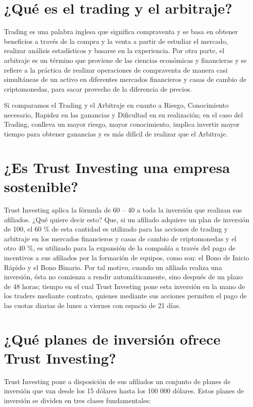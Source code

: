 \documentclass[12pt,letterpaper]{article}
\begin{document}
	\section{¿Qué es el trading y el arbitraje?}
	Trading es una palabra inglesa que significa compraventa y se basa en obtener beneficios a través de la compra y la venta a partir de estudiar el mercado, realizar análisis estadísticos y basarse en la experiencia. Por otra parte, el arbitraje es un término que proviene de las ciencias económicas y financieras y se refiere a la práctica de realizar operaciones de compraventa de manera casi simultáneas de un activo en diferentes mercados financieros y casas de cambio de criptomonedas, para sacar provecho de la diferencia de precios.
	
	Si comparamos el Trading y el Arbitraje en cuanto a Riesgo, Conocimiento necesario, Rapidez en las ganancias y Dificultad en su realización; en el caso del Trading, conlleva un mayor riesgo, mayor conocimiento, implica invertir mayor tiempo para obtener ganancias y es más difícil de realizar que el Arbitraje.
	
	\section{¿Es Trust Investing una empresa sostenible?}
	Trust Investing aplica la fórmula de 60 – 40 a toda la inversión que realizan sus afiliados. ¿Qué quiere decir esto? Que, si un afiliado adquiere un plan de inversión de 100, el 60 \% de esta cantidad es utilizado para las acciones de trading y arbitraje en los mercados financieros y casas de cambio de criptomonedas y el otro 40 \%, es utilizado para la expansión de la compañía a través del pago de incentivos a sus afiliados por la formación de equipos, como son: el Bono de Inicio Rápido y el Bono Binario.
	Por tal motivo, cuando un afiliado realiza una inversión, ésta no comienza a rendir automáticamente, sino después de un plazo de 48 horas; tiempo en el cual Trust Investing pone esta inversión en la mano de los traders mediante contrato, quienes mediante sus acciones permiten el pago de las cuotas diarias de lunes a viernes con espacio de 21 días.
	
	\section{¿Qué planes de inversión ofrece Trust Investing?}
	Trust Investing pone a disposición de sus afiliados un conjunto de planes de inversión que van desde los 15 dólares hasta los 100 000 dólares. Estos planes de inversión se dividen en tres clases fundamentales:
	
\end{document}
